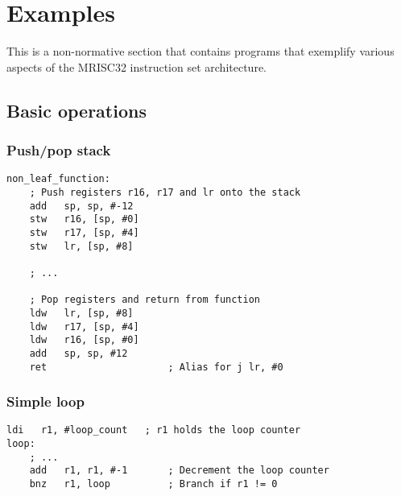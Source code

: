 %

\chapter{Examples}

This is a non-normative section that contains programs that exemplify various
aspects of the MRISC32 instruction set architecture.

\section{Basic operations}

\subsection{Push/pop stack}

\begin{lstlisting}[style=assembler]
non_leaf_function:
    ; Push registers r16, r17 and lr onto the stack
    add   sp, sp, #-12
    stw   r16, [sp, #0]
    stw   r17, [sp, #4]
    stw   lr, [sp, #8]

    ; ...

    ; Pop registers and return from function
    ldw   lr, [sp, #8]
    ldw   r17, [sp, #4]
    ldw   r16, [sp, #0]
    add   sp, sp, #12
    ret                     ; Alias for j lr, #0
\end{lstlisting}

\subsection{Simple loop}

\begin{lstlisting}[style=assembler]
    ldi   r1, #loop_count   ; r1 holds the loop counter
loop:
    ; ...
    add   r1, r1, #-1       ; Decrement the loop counter
    bnz   r1, loop          ; Branch if r1 != 0
\end{lstlisting}

